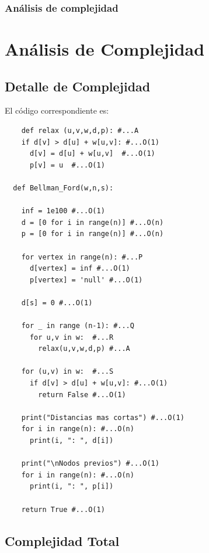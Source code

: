 \subsubsection{Análisis de complejidad}

\section*{Análisis de Complejidad}

\subsection*{Detalle de Complejidad}

El código correspondiente es:
\begin{lstlisting}
	def relax (u,v,w,d,p): #...A
	if d[v] > d[u] + w[u,v]: #...O(1)
	  d[v] = d[u] + w[u,v]	#...O(1)
	  p[v] = u	#...O(1)
  
  def Bellman_Ford(w,n,s):
  
	inf = 1e100 #...O(1)
	d = [0 for i in range(n)] #...O(n)
	p = [0 for i in range(n)] #...O(n)
  
	for vertex in range(n): #...P
	  d[vertex] = inf #...O(1)
	  p[vertex] = 'null' #...O(1)
  
	d[s] = 0 #...O(1)
  
	for _ in range (n-1): #...Q
	  for u,v in w:  #...R
		relax(u,v,w,d,p) #...A
  
	for (u,v) in w:  #...S
	  if d[v] > d[u] + w[u,v]: #...O(1)
		return False #...O(1)
  
	print("Distancias mas cortas") #...O(1)
	for i in range(n): #...O(n)
	  print(i, ": ", d[i])
  
	print("\nNodos previos") #...O(1)
	for i in range(n): #...O(n)
	  print(i, ": ", p[i])
  
	return True #...O(1)

\end{lstlisting}

\subsection*{Complejidad Total}
